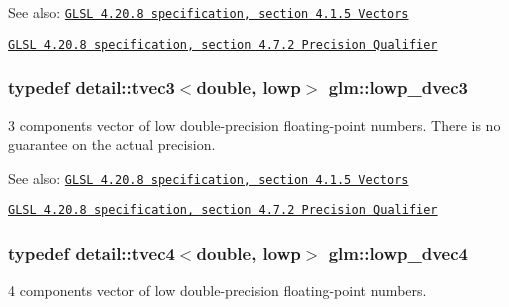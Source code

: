 \begin{Desc}
\item[See also:]\href{http://www.opengl.org/registry/doc/GLSLangSpec.4.20.8.pdf}{\tt GLSL 4.20.8 specification, section 4.1.5 Vectors} 

\href{http://www.opengl.org/registry/doc/GLSLangSpec.4.20.8.pdf}{\tt GLSL 4.20.8 specification, section 4.7.2 Precision Qualifier} \end{Desc}
\hypertarget{group__core__precision_g9bdb864f7242863e1227e3209f5b2dc4}{
\subsubsection[lowp\_\-dvec3]{\setlength{\rightskip}{0pt plus 5cm}typedef detail::tvec3$<$double, lowp$>$ {\bf glm::lowp\_\-dvec3}}}
\label{group__core__precision_g9bdb864f7242863e1227e3209f5b2dc4}


3 components vector of low double-precision floating-point numbers. There is no guarantee on the actual precision.

\begin{Desc}
\item[See also:]\href{http://www.opengl.org/registry/doc/GLSLangSpec.4.20.8.pdf}{\tt GLSL 4.20.8 specification, section 4.1.5 Vectors} 

\href{http://www.opengl.org/registry/doc/GLSLangSpec.4.20.8.pdf}{\tt GLSL 4.20.8 specification, section 4.7.2 Precision Qualifier} \end{Desc}
\hypertarget{group__core__precision_gd04432e5d5accf764e10c6674e5d0c96}{
\subsubsection[lowp\_\-dvec4]{\setlength{\rightskip}{0pt plus 5cm}typedef detail::tvec4$<$double, lowp$>$ {\bf glm::lowp\_\-dvec4}}}
\label{group__core__precision_gd04432e5d5accf764e10c6674e5d0c96}


4 components vector of low double-precision floating-point numbers.

